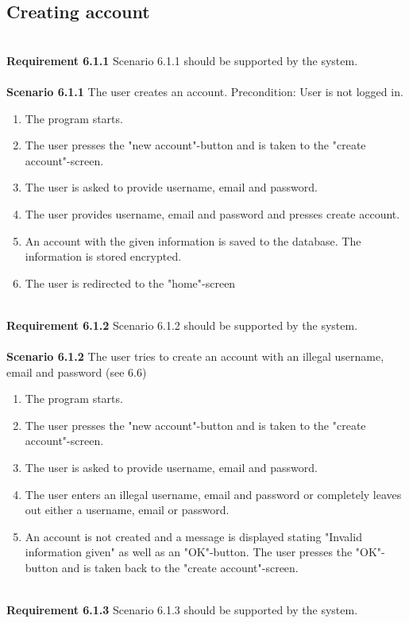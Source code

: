 \documentclass{article}
\begin{document}
\subsection{Creating account}
\mbox{}\\
\textbf{Requirement 6.1.1} Scenario 6.1.1 should be supported by the system.
\\ \\
\textbf{Scenario 6.1.1} The user creates an account. Precondition: User is not logged in. 
\begin{enumerate}
    \item The program starts.
    \item The user presses the "new account"-button and is taken to the "create account"-screen.
    \item The user is asked to provide username, email and password.
    \item The user provides username, email and password and presses create account.
    \item An account with the given information is saved to the database. The information is stored encrypted.
    \item The user is redirected to the "home"-screen
\end{enumerate}
\mbox{}\\
\textbf{Requirement 6.1.2} Scenario 6.1.2 should be supported by the system.
\\ \\
\textbf{Scenario 6.1.2} The user tries to create an account with an illegal username, email and password (see 6.6)
\begin{enumerate}
    \item The program starts.
    \item The user presses the "new account"-button and is taken to the "create account"-screen.
    \item The user is asked to provide username, email and password.
    \item The user enters an illegal username, email and password or completely leaves out either a username, email or password.
    \item An account is not created and a message is displayed stating "Invalid information given" as well as an "OK"-button. The user presses the "OK"-button and is taken back to the "create account"-screen.
\end{enumerate}
\mbox{}\\
\textbf{Requirement 6.1.3} Scenario 6.1.3 should be supported by the system.
\\ \\
\end{document}
